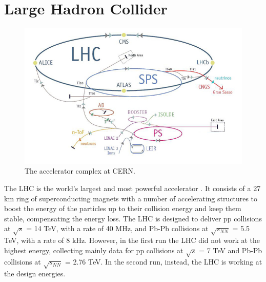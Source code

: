 \section{Large Hadron Collider}
%
\begin{figure}
  \centering
  \includegraphics[scale=0.55]{figures/LHC.jpg}
  \caption{The accelerator complex at CERN.}
  \label{fig:LHC}
\end{figure}
%
The LHC is the world's largest and most powerful accelerator \cite{lhc}. It consists of a 27 km ring of superconducting magnets with a number of accelerating structures to boost the energy of the particles up to their collision energy and keep them stable, compensating the energy loss. The LHC is designed to deliver pp collisions at $\sqrt{s}$ = 14 TeV, with a rate of 40 MHz, and Pb-Pb collisions at $\sqrt{s_{NN}}$ = 5.5 TeV, with a rate of 8 kHz. However, in the first run the LHC did not work at the highest energy, collecting mainly data for pp collisions at $\sqrt{s}$ = 7 TeV and Pb-Pb collisions at $\sqrt{s_{NN}}$ = 2.76 TeV. In the second run, instead, the LHC is working at the design energies.\\
